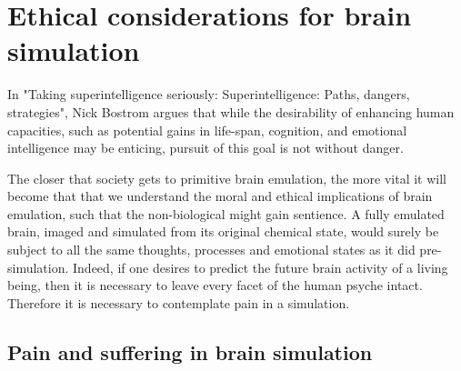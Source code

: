 

\chapter{Ethical considerations for brain simulation}

In "Taking superintelligence seriously: Superintelligence: Paths, dangers,
strategies", Nick Bostrom argues that while the desirability of enhancing human
capacities, such as potential gains in life-span, cognition, and emotional
intelligence may be enticing, pursuit of this goal is not without danger.
\autocite{bostrom_superintelligence_2014}

The closer that society gets to primitive brain emulation, the more vital it
will become that that we understand the moral and ethical implications of brain
emulation, such that the non-biological might gain sentience. A fully emulated
brain, imaged and simulated from its original chemical state, would surely be
subject to all the same thoughts, processes and emotional states as it did
pre-simulation. Indeed, if one desires to predict the future brain activity of a
living being, then it is necessary to leave every facet of the human psyche
intact. Therefore it is necessary to contemplate pain in a simulation.


\section{Pain and suffering in brain simulation}

